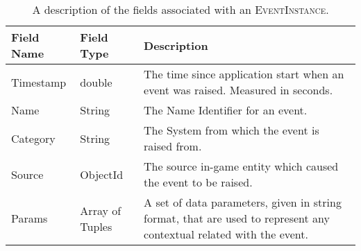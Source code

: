 
\begin{table}
    \begin{center}
      \caption{A description of the fields associated with an \textsc{EventInstance}.}
      \label{tab:event-instance}
      \begin{tabular}{ >{\small}w{l}{5em} m{7em} m{16em} } %
        \addlinespace
        \toprule
        \bf Field Name & \bf Field Type  & \bf Description \\
        \midrule
        Timestamp      & double          & The time since application start when an event was 
                                           raised. Measured in seconds.                        \\
        Name           & String          & The Name Identifier for an event.                   \\
        Category       & String          & The System from which the event is raised from.     \\
        Source         & ObjectId        & The source in-game entity which caused the event to 
                                           be raised.                                          \\
        Params         & Array of Tuples & A set of data parameters, given in string format,  
                                           that are used to represent any contextual related 
                                           with the event.                                     \\
        \bottomrule
      \end{tabular}
    \end{center}
\end{table}